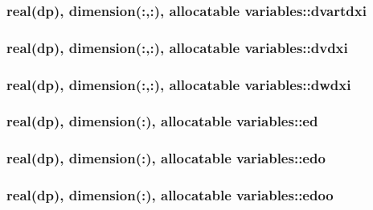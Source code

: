 \hypertarget{classvariables_aac67db3d7658de3c9bcab981064055dc}{
\subsubsection[{dvartdxi}]{\setlength{\rightskip}{0pt plus 5cm}real(dp), dimension(\-:,\-:), allocatable variables\-::dvartdxi}}\label{classvariables_aac67db3d7658de3c9bcab981064055dc}
\hypertarget{classvariables_a1a0e5852e192a2d1781836fcc07ea35d}{
\subsubsection[{dvdxi}]{\setlength{\rightskip}{0pt plus 5cm}real(dp), dimension(\-:,\-:), allocatable variables\-::dvdxi}}\label{classvariables_a1a0e5852e192a2d1781836fcc07ea35d}
\hypertarget{classvariables_a1235eb8caf98213f84ecb70e9c75b21f}{
\subsubsection[{dwdxi}]{\setlength{\rightskip}{0pt plus 5cm}real(dp), dimension(\-:,\-:), allocatable variables\-::dwdxi}}\label{classvariables_a1235eb8caf98213f84ecb70e9c75b21f}
\hypertarget{classvariables_aad1b3731d203da8923cd7e6a879d586b}{
\subsubsection[{ed}]{\setlength{\rightskip}{0pt plus 5cm}real(dp), dimension(\-:), allocatable variables\-::ed}}\label{classvariables_aad1b3731d203da8923cd7e6a879d586b}
\hypertarget{classvariables_a4115296d169e26d3ea3a3e03cf798387}{
\subsubsection[{edo}]{\setlength{\rightskip}{0pt plus 5cm}real(dp), dimension(\-:), allocatable variables\-::edo}}\label{classvariables_a4115296d169e26d3ea3a3e03cf798387}
\hypertarget{classvariables_ab301c0d89bffdb529a9c8b09e280744d}{
\subsubsection[{edoo}]{\setlength{\rightskip}{0pt plus 5cm}real(dp), dimension(\-:), allocatable variables\-::edoo}}\label{classvariables_ab301c0d89bffdb529a9c8b09e280744d}
